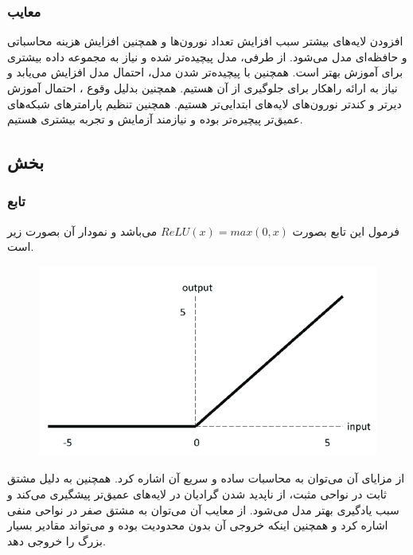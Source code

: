 \documentclass[12pt]{article}
\begin{document}
	\subsubsection{معایب}
	افزودن لایه‌های بیشتر سبب افزایش تعداد نورون‌ها و همچنین افزایش هزینه محاسباتی و حافظه‌ای مدل می‌شود. از طرفی، مدل پیچیده‌تر شده و نیاز به مجموعه داده بیشتری برای آموزش بهتر است. همچنین با پیچیده‌تر شدن مدل، احتمال  مدل افزایش می‌یابد و نیاز به ارائه راهکار برای جلوگیری از آن هستیم. همچنین بدلیل وقوع ، احتمال آموزش دیرتر و کندتر نورون‌های لایه‌های ابتدایی‌تر هستیم. همچنین تنظیم پارامترهای شبکه‌های عمیق‌تر پیچیره‌تر بوده و نیازمند آزمایش و تجربه بیشتری هستیم.
	\subsection{بخش }
	\subsubsection{تابع }
	فرمول این تابع بصورت $ReLU(x) = max(0, x)$ می‌باشد و نمودار آن بصورت زیر است.
	\begin{figure}[H]
		\centering
		\includegraphics[scale=0.3]{pic_4.png}
	\end{figure}
	از مزایای آن می‌توان به محاسبات ساده و سریع آن اشاره کرد. همچنین به دلیل مشتق ثابت در نواحی مثبت، از ناپدید شدن گرادیان در لایه‌های عمیق‌تر پیشگیری می‌کند و سبب یادگیری بهتر مدل می‌شود. از معایب آن می‌توان به مشتق صفر در نواحی منفی اشاره کرد و همچنین اینکه خروجی آن بدون محدودیت بوده و می‌تواند مقادیر بسیار بزرگ را خروجی دهد.
\end{document}
